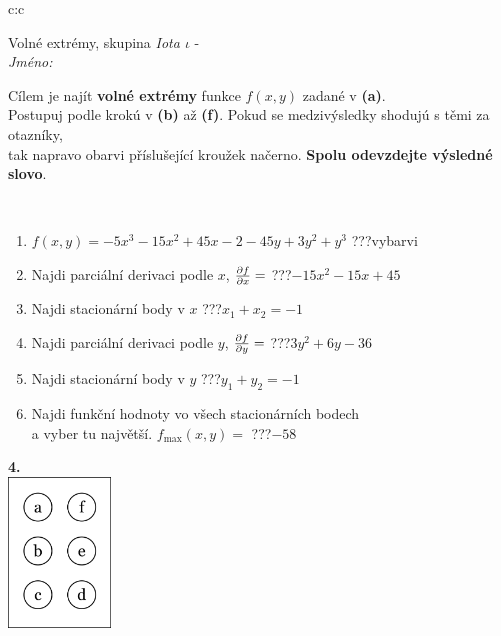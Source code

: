 \documentclass[10pt]{report}
\begin{document}
\begin{tabular}{c:c}
\begin{minipage}[c][104.5mm][t]{0.5\linewidth}
\begin{center}
\vspace{7mm}
{\huge Volné extrémy, skupina \textit{Iota $\iota$} -}\\[5mm]
\textit{Jméno:}\phantom{xxxxxxxxxxxxxxxxxxxxxxxxxxxxxxxxxxxxxxxxxxxxxxxxxxxxxxxxxxxxxxxxx}\\[5mm]
\begin{minipage}{0.95\linewidth}
\begin{center}
Cílem je najít \textbf{volné extrémy} funkce $f(x,y)$ zadané v \textbf{(a)}.\\Postupuj podle krokú v \textbf{(b)} až \textbf{(f)}. Pokud se medzivýsledky shodujú s těmi za otazníky,\\tak napravo obarvi příslušející kroužek načerno. \textbf{Spolu odevzdejte výsledné slovo}.
\end{center}
\end{minipage}
\\[1mm]
\begin{minipage}{0.79\linewidth}
\begin{center}
\begin{varwidth}{\linewidth}
\begin{enumerate}
\normalsize
\item $f(x,y)=-5x^3-15x^2+45x-2-45y+3y^2+y^3$\quad \dotfill\; ???\;\dotfill \quad vybarvi
\item Najdi parciální derivaci podle $x$, $\pdv{f}{x}=$\quad \dotfill\; ???\;\dotfill \quad $-15x^2-15x+45$
\item Najdi stacionární body v $x$\quad \dotfill\; ???\;\dotfill \quad $x_1+x_2=-1$
\item Najdi parciální derivaci podle $y$, $\pdv{f}{y}=$\quad \dotfill\; ???\;\dotfill \quad $3y^2+6y-36$
\item Najdi stacionární body v $y$\quad \dotfill\; ???\;\dotfill \quad $y_1+y_2=-1$
\item Najdi funkční hodnoty vo všech stacionárních bodech \\ \phantom{xxxxxx} a vyber tu najvětší. $f_{\text{max}}(x,y)=$\quad \dotfill\; ???\;\dotfill \quad $-58$
\end{enumerate}
\end{varwidth}
\end{center}
\end{minipage}
\begin{minipage}{0.20\linewidth}
\begin{center}
{\Huge\bfseries 4.} \\[2mm]
\includegraphics[height=40mm]{../images/braille.png}

\end{center}
\end{minipage}
\end{center}
\end{minipage}
\end{tabular}
\end{document}
